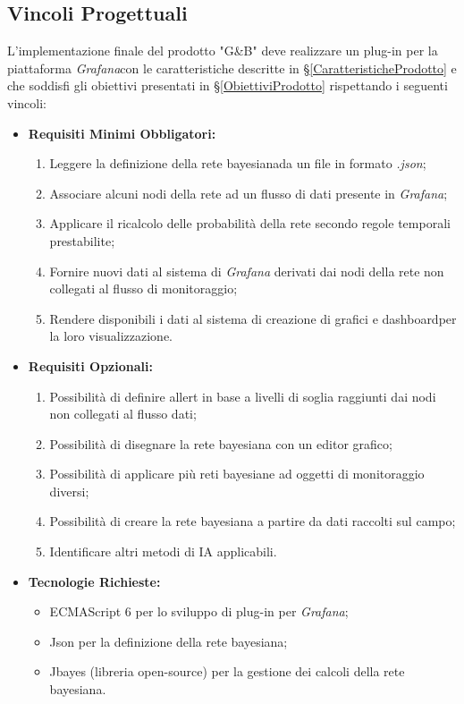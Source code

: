 \subsection{Vincoli Progettuali}\label{VincoliProgettuali}
L'implementazione finale del prodotto "G\&B" deve realizzare un plug-in per la piattaforma \textit{Grafana}\glossario con le caratteristiche descritte in §\ref{CaratteristicheProdotto} e che soddisfi gli obiettivi presentati in §\ref{ObiettiviProdotto} rispettando i seguenti vincoli:
\begin{itemize}
\item \textbf{Requisiti Minimi Obbligatori:}
	\begin{enumerate}
	\item Leggere la definizione della rete bayesiana\glossario da un file in formato \textit{.json}\glossario;
	\item Associare alcuni nodi della rete ad un flusso di dati presente in \textit{Grafana}\glossario;
	\item Applicare il ricalcolo delle probabilità della rete secondo regole temporali prestabilite;
	\item Fornire nuovi dati al sistema di \textit{Grafana} derivati dai nodi della rete non collegati al flusso di monitoraggio;
	\item Rendere disponibili i dati al sistema di creazione di grafici e dashboard\glossario per la loro visualizzazione.
	\end{enumerate}
\item \textbf{Requisiti Opzionali:}
	\begin{enumerate}
	\item Possibilità di definire allert in base a livelli di soglia raggiunti dai nodi non collegati al flusso dati;
	\item Possibilità di disegnare la rete bayesiana con un editor grafico;
	\item Possibilità di applicare più reti bayesiane ad oggetti di monitoraggio diversi;
	\item Possibilità di creare la rete bayesiana a partire da dati raccolti sul campo;
	\item Identificare altri metodi di IA applicabili.
	\end{enumerate}
\item \textbf{Tecnologie Richieste:}
	\begin{itemize}
	\item ECMAScript 6 per lo sviluppo di plug-in per \textit{Grafana};
	\item Json per la definizione della rete bayesiana;
	\item Jbayes (libreria open-source) per la gestione dei calcoli della rete bayesiana.
	\end{itemize}
\end{itemize}
 
